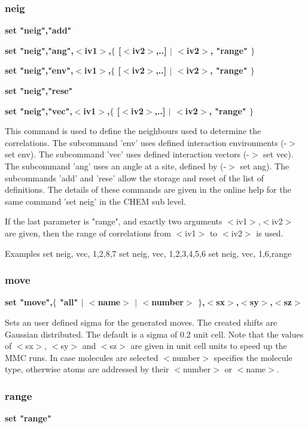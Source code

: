 \subsubsection{neig}
{\bf set "neig","add" \par }
{\bf set "neig","ang",$ <$iv1$> $,$ \{$ [$ <$iv2$> $,..] $| $ $ <$iv2$> $, "range" $\} $ \par }
{\bf set "neig","env",$ <$iv1$> $,$ \{$ [$ <$iv2$> $,..] $| $ $ <$iv2$> $, "range" $\} $ \par }
{\bf set "neig","rese" \par }
{\bf set "neig","vec",$ <$iv1$> $,$ \{$ [$ <$iv2$> $,..] $| $ $ <$iv2$> $, "range" $\} $ \par }
\par
\vspace{3pt}
This command is used to define the neighbours used to determine the 
correlations. The subcommand 'env' uses defined interaction 
environments (-$> $ set env). The subcommand 'vec' uses defined 
interaction vectors (-$> $ set vec). The 
subcommand 'ang' uses an angle at a site, defined by (-$> $ set ang). The 
subcommands 'add' and 'rese' allow the storage and reset of the 
list of definitions. The details of these commands are given in the 
online help for the same command 'set neig' in the CHEM sub level. 
\par
If the last parameter is "range", and exactly two arguments 
$ <$iv1$> $,$ <$iv2$> $ are given, then the range of correlations from 
$ <$iv1$> $ to $ <$iv2$> $ is used. 
\par
Examples 
set neig, vec, 1,2,8,7 
set neig, vec, 1,2,3,4,5,6 
set neig, vec, 1,6,range 
\subsubsection{move}
{\bf set "move",$ \{$ "all" $| $ $ <$name$> $ $| $ $ <$number$> $ $\} $,$ <$sx$> $,$ <$sy$> $,$ <$sz$> $ \par }
\par
\vspace{3pt}
Sets an user defined sigma for the generated moves. The created shifts 
are Gaussian distributed. The default is a sigma of 0.2 unit cell. Note 
that the values of $ <$sx$> $, $ <$sy$> $ and $ <$sz$> $ are given in unit cell units to 
speed up the MMC runs. In case molecules are selected $ <$number$> $ specifies 
the molecule type, otherwise atoms are addressed by their $ <$number$> $ or 
$ <$name$> $. 
\subsubsection{range}
{\bf set "range" \par }
\par
